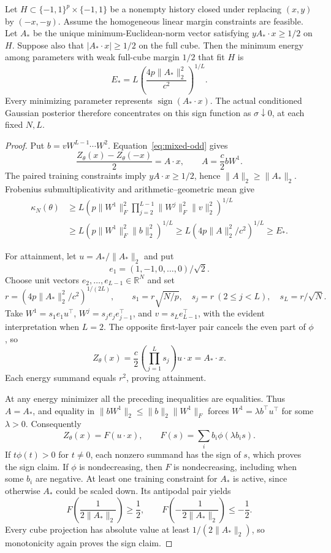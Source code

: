 \begin{lemma}
\label{lem:mixed-energy}
Let $H\subset\{-1,1\}^p\times\{-1,1\}$ be a nonempty history closed
under replacing $(x,y)$ by $(-x,-y)$. Assume the homogeneous linear margin constraints
are feasible. Let $A_*$ be the unique minimum-Euclidean-norm vector
satisfying $yA_*\cdot x\ge1/2$ on $H$. Suppose also that
$|A_*\cdot x|\ge1/2$ on the full cube. Then the minimum energy among
parameters with weak full-cube margin $1/2$ that fit $H$ is
\[
 E_*=L\left(\frac{4p\|A_*\|_2^2}{c^2}\right)^{1/L}.
\]
Every minimizing parameter represents $\operatorname{sign}(A_*\cdot x)$.
The actual conditioned Gaussian posterior therefore concentrates on
this sign function as $\sigma\downarrow0$, at each fixed $N,L$.
\end{lemma}
\begin{proof}
Put $b=vW^{L-1}\cdots W^2$. Equation~\eqref{eq:mixed-odd} gives
\[
 \frac{Z_\theta(x)-Z_\theta(-x)}2=A\cdot x,
 \qquad A=\frac c2 bW^1.
\]
The paired training constraints imply $yA\cdot x\ge1/2$, hence
$\|A\|_2\ge\|A_*\|_2$. Frobenius submultiplicativity and
arithmetic--geometric mean give
\begin{align*}
 \kappa_N(\theta)
 &\ge L\left(p\|W^1\|_F^2
       \prod_{j=2}^{L-1}\|W^j\|_F^2\|v\|_2^2\right)^{1/L}\\
 &\ge L\left(p\|W^1\|_F^2\|b\|_2^2\right)^{1/L}
 \ge L\left(4p\|A\|_2^2/c^2\right)^{1/L}\ge E_*.
\end{align*}

For attainment, let $u=A_*/\|A_*\|_2$ and put
\[
 e_1=(1,-1,0,\ldots,0)/\sqrt2.
\]
Choose unit vectors $e_2,\ldots,e_{L-1}\in\mathbb R^N$ and set
\[
 r=\left(4p\|A_*\|_2^2/c^2\right)^{1/(2L)},\qquad
 s_1=r\sqrt{N/p},\quad s_j=r\ (2\le j<L),\quad
 s_L=r/\sqrt N.
\]
Take $W^1=s_1e_1u^\top$, $W^j=s_je_je_{j-1}^\top$, and
$v=s_Le_{L-1}^\top$, with the evident interpretation when $L=2$.
The opposite first-layer pair cancels the even part of $\phi$, so
\[
 Z_\theta(x)=\frac c2\left(\prod_{j=1}^Ls_j\right)u\cdot x
             =A_*\cdot x.
\]
Each energy summand equals $r^2$, proving attainment.

At any energy minimizer all the preceding inequalities are equalities.
Thus $A=A_*$, and equality in
$\|bW^1\|_2\le\|b\|_2\|W^1\|_F$ forces
$W^1=\lambda b^\top u^\top$ for some $\lambda>0$. Consequently
\[
 Z_\theta(x)=F(u\cdot x),\qquad
 F(s)=\sum_i b_i\phi(\lambda b_is).
\]
If $t\phi(t)>0$ for $t\ne0$, each nonzero summand has the sign of
$s$, which proves the sign claim. If $\phi$ is nondecreasing, then
$F$ is nondecreasing, including when some $b_i$ are negative.
At least one training constraint for $A_*$ is active, since otherwise
$A_*$ could be scaled down. Its antipodal pair yields
\[
 F\left(\frac1{2\|A_*\|_2}\right)\ge\frac12,\qquad
 F\left(-\frac1{2\|A_*\|_2}\right)\le-\frac12.
\]
Every cube projection has absolute value at least
$1/(2\|A_*\|_2)$, so monotonicity again proves the sign claim.


\end{proof}

